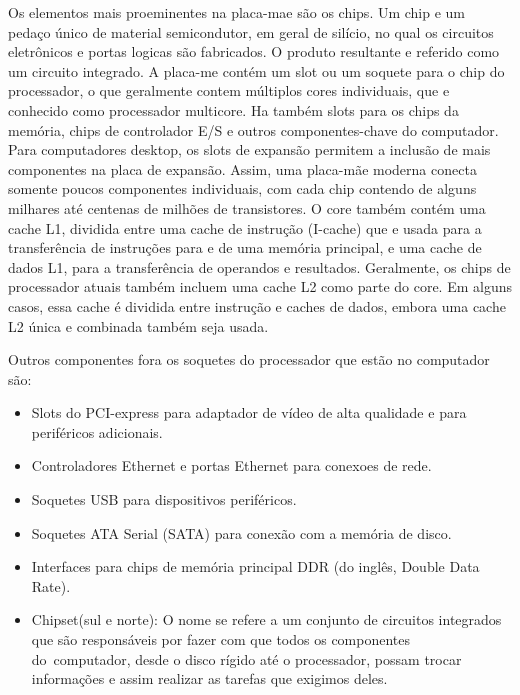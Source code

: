 \documentclass{article}
\begin{document}
Os elementos mais proeminentes na placa-mae são os chips. Um chip e um pedaço
único de material semicondutor, em geral de silício, no qual os circuitos
eletrônicos e portas logicas são fabricados. O produto resultante e referido
como um circuito integrado. A placa-me contém um slot ou um soquete para o chip
do processador, o que geralmente contem múltiplos cores individuais, que e
conhecido como processador multicore. Ha também slots para os chips da memória,
chips de controlador E/S e outros componentes-chave do computador. Para
computadores desktop, os slots de expansão permitem a inclusão de mais
componentes na placa de expansão. Assim, uma placa-mãe moderna conecta somente
poucos componentes individuais, com cada chip contendo de alguns milhares até
centenas de milhões de transistores. 	O core também contém uma cache L1,
dividida entre uma cache de instrução (I-cache) que e usada para a
transferência de instruções para e de uma memória principal, e uma cache de
dados L1, para a transferência de operandos e resultados. Geralmente, os chips
de processador atuais também incluem uma cache L2 como parte do core. Em alguns
casos, essa cache é dividida entre instrução e caches de dados, embora uma
cache L2 única e combinada também seja usada.

Outros componentes fora os soquetes do processador que estão no computador são:

\begin{itemize}
    \item Slots do PCI-express para adaptador de vídeo de alta
        qualidade e para periféricos adicionais.

    \item Controladores Ethernet e portas Ethernet para conexoes de rede.
        
    \item Soquetes USB para dispositivos periféricos.

    \item Soquetes ATA Serial (SATA) para conexão com a memória de disco.

    \item Interfaces para chips de memória principal DDR (do inglês, Double
        Data Rate).

    \item Chipset(sul e norte):  O nome se refere a um conjunto de circuitos
        integrados que são responsáveis por fazer com que todos os componentes
        do computador, desde o disco rígido até o processador, possam trocar
        informações e assim realizar as tarefas que exigimos deles.
\end{itemize}
\end{document}
